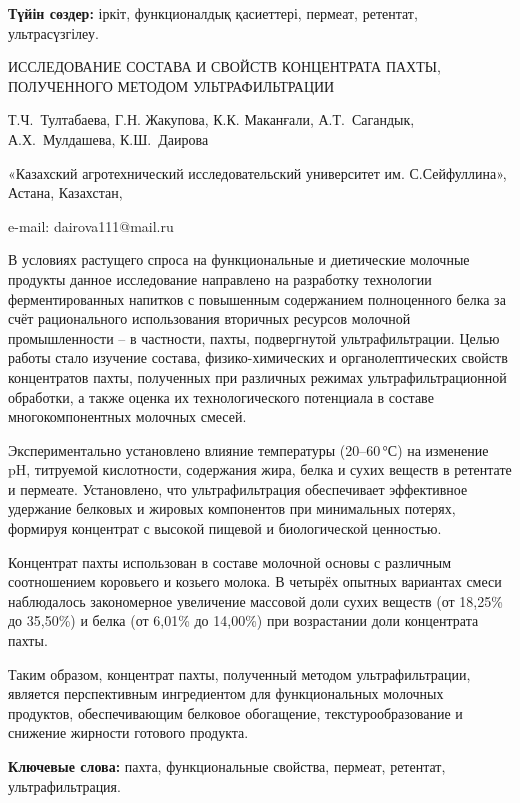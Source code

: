 {\bfseries Түйін сөздер:} іркіт, функционалдық қасиеттері, пермеат,
ретентат, ультрасүзгілеу.

\begin{header}
ИССЛЕДОВАНИЕ СОСТАВА И СВОЙСТВ КОНЦЕНТРАТА ПАХТЫ, ПОЛУЧЕННОГО МЕТОДОМ УЛЬТРАФИЛЬТРАЦИИ

Т.Ч.~Тултабаева,
Г.Н. Жакупова,
К.К. Маканғали,
А.Т.~Сагандык,
А.Х.~Мулдашева,
К.Ш.~Даирова\envelope
\end{header}

\begin{affil}
«Казахский агротехнический исследовательский университет им. С.Сейфуллина», Астана, Казахстан,

e-mail: dairova111@mail.ru
\end{affil}

В условиях растущего спроса на функциональные и диетические молочные
продукты данное исследование направлено на разработку технологии
ферментированных напитков с повышенным содержанием полноценного белка за
счёт рационального использования вторичных ресурсов молочной
промышленности -- в частности, пахты, подвергнутой ультрафильтрации.
Целью работы стало изучение состава, физико-химических и
органолептических свойств концентратов пахты, полученных при различных
режимах ультрафильтрационной обработки, а также оценка их
технологического потенциала в составе многокомпонентных молочных смесей.

Экспериментально установлено влияние температуры (20--60\,°С) на
изменение pH, титруемой кислотности, содержания жира, белка и сухих
веществ в ретентате и пермеате. Установлено, что ультрафильтрация
обеспечивает эффективное удержание белковых и жировых компонентов при
минимальных потерях, формируя концентрат с высокой пищевой и
биологической ценностью.

Концентрат пахты использован в составе молочной основы с различным
соотношением коровьего и козьего молока. В четырёх опытных вариантах
смеси наблюдалось закономерное увеличение массовой доли сухих веществ
(от 18,25\% до 35,50\%) и белка (от 6,01\% до 14,00\%) при возрастании
доли концентрата пахты.

Таким образом, концентрат пахты, полученный методом ультрафильтрации,
является перспективным ингредиентом для функциональных молочных
продуктов, обеспечивающим белковое обогащение, текстурообразование и
снижение жирности готового продукта.

{\bfseries Ключевые слова:} пахта, функциональные свойства, пермеат,
ретентат, ультрафильтрация.

